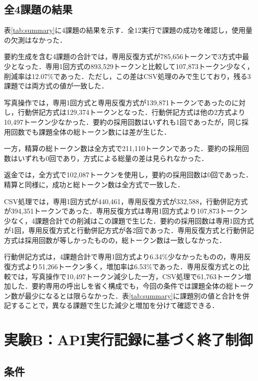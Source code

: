 \documentclass[letter]{ieicej}
\begin{document}
\subsection{全4課題の結果}

表\ref{tab:summary}に4課題の結果を示す．全12実行で課題の成功を確認し，使用量の欠測はなかった．

\SummaryResultsTable

要約生成を含む4課題の合計では，専用反復方式が785,656トークンで3方式中最少となった．専用1回方式の893,529トークンと比較して107,873トークン少なく，削減率は12.07\%であった．ただし，この差はCSV処理のみで生じており，残る3課題では両方式の値が一致した．

写真操作では，専用1回方式と専用反復方式が139,871トークンであったのに対し，行動併記方式は129,374トークンとなった．行動併記方式は他の2方式より10,497トークン少なかった．要約の採用回数はいずれも1回であったが，同じ採用回数でも課題全体の総トークン数には差が生じた．

一方，精算の総トークン数は全方式で211,110トークンであった．要約の採用回数はいずれも0回であり，方式による総量の差は見られなかった．

返金では，全方式で102,087トークンを使用し，要約の採用回数は0回であった．精算と同様に，成功と総トークン数は全方式で一致した．

CSV処理では，専用1回方式が440,461，専用反復方式が332,588，行動併記方式が394,351トークンであった．専用反復方式は専用1回方式より107,873トークン少なく，4課題合計での削減はこの課題で生じた．要約の採用回数は専用1回方式が1回，専用反復方式と行動併記方式が各2回であった．専用反復方式と行動併記方式は採用回数が等しかったものの，総トークン数は一致しなかった．

行動併記方式は，4課題合計で専用1回方式より6.34\%少なかったものの，専用反復方式より51,266トークン多く，増加率は6.53\%であった．専用反復方式との比較では，写真操作で10,497トークン減少した一方，CSV処理で61,763トークン増加した．要約専用の呼出しを省く構成でも，今回の条件では課題全体の総トークン数が最少になるとは限らなかった．表\ref{tab:summary}に課題別の値と合計を併記することで，異なる課題で生じた減少と増加を分けて確認できる．

\section{実験B：API実行記録に基づく終了制御}

\subsection{条件}
\end{document}
